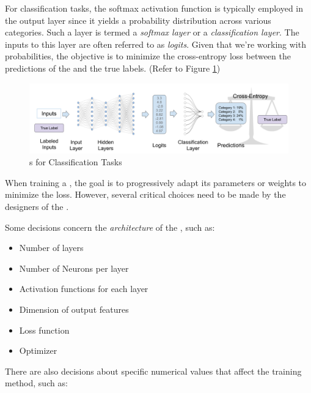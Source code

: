 For classification tasks, the \gls{softmax} activation function is typically employed in the output layer since it yields a probability distribution across various categories. Such a layer is termed a \emph{\gls{softmax} layer} or a \emph{classification layer}. The inputs to this layer are often referred to as \emph{logits}. Given that we're working with probabilities, the objective is to minimize the cross-entropy loss between the predictions of the \neuralNetwork{} and the true labels.
(Refer to Figure \ref{fig:02_nn_nns_for_classification})

\begin{figure}
    \centering
    \includegraphics[width=\textwidth]{Figures/02/02_nns_for_classification.png}
    \caption{\neuralNetwork{}s for Classification Tasks}
    \label{fig:02_nn_nns_for_classification}
\end{figure}



\label{02_nn_hyperparameters}

When training a \neuralNetwork{}, the goal is to progressively adapt its parameters or weights to minimize the loss. However, several critical choices need to be made by the designers of the \neuralNetwork{}.

Some decisions concern the \emph{architecture} of the \neuralNetwork{}, such as:

\begin{itemize}
    \item Number of layers
    \item Number of Neurons per layer
    \item Activation functions for each layer
    \item Dimension of output features
    \item Loss function
    \item Optimizer
\end{itemize}

There are also decisions about specific numerical values that affect the training method, such as:



